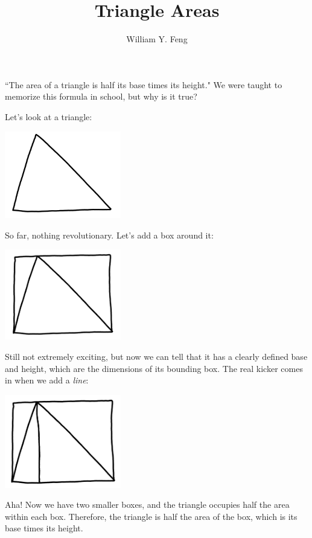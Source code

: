 \documentclass{article}
\title{Triangle Areas}
\author{William Y. Feng}
\begin{document}
\maketitle
``The area of a triangle is half its base times its height." We were taught to memorize this formula in school, but why is it true?

Let's look at a triangle:
\begin{center}
    \centering
    \includegraphics[width=2in]{images/triangle_areas/part_1/raw_triangle.png}
\end{center}
So far, nothing revolutionary. Let's add a box around it:
\begin{center}
    \centering
    \includegraphics[width=2in]{images/triangle_areas/part_1/triangle_in_box.png}
\end{center}
Still not extremely exciting, but now we can tell that it has a clearly defined base and height, which are the dimensions of its bounding box. The real kicker comes in when we add a \textit{line}:
\begin{center}
    \centering
    \includegraphics[width=2in]{images/triangle_areas/part_1/triangle_in_box_line.png}
\end{center}
Aha! Now we have two smaller boxes, and the triangle occupies half the area within each box. Therefore, the triangle is half the area of the box, which is its base times its height.
\end{document}
